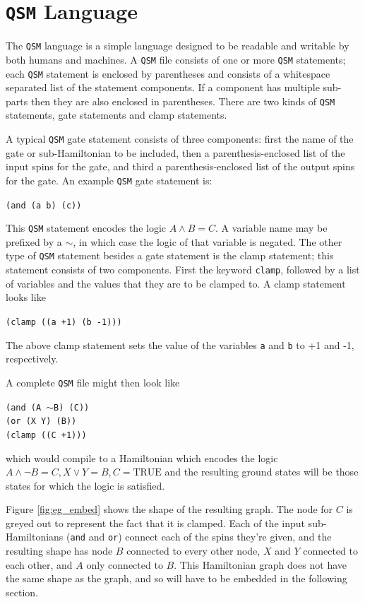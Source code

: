 \section{\texttt{QSM} Language}
The \texttt{QSM} language is a simple language designed to be readable and writable by both humans and machines.  A \texttt{QSM} file consists of one or more \texttt{QSM} statements; each \texttt{QSM} statement is enclosed by parentheses and consists of a whitespace separated list of the statement components.  If a component has multiple sub-parts then they are also enclosed in parentheses.  There are two kinds of \texttt{QSM} statements, gate statements and clamp statements.

A typical \texttt{QSM} gate statement consists of three components: first the name of the gate or sub-Hamiltonian to be included, then a parenthesis-enclosed list of the input spins for the gate, and third a parenthesis-enclosed list of the output spins for the gate.  An example \texttt{QSM} gate statement is: 
\begin{center}
	\texttt{(and (a b) (c))}
\end{center}
This \texttt{QSM} statement encodes the logic $A \wedge B = C$.  A variable name may be prefixed by a $\sim$, in which case the logic of that variable is negated.  The other type of \texttt{QSM} statement besides a gate statement is the clamp statement; this statement consists of two components.  First the keyword \texttt{clamp}, followed by a list of variables and the values that they are to be clamped to.  A clamp statement looks like
\begin{center}
	\texttt{(clamp ((a +1) (b -1)))}
\end{center}
The above clamp statement sets the value of the variables \texttt{a} and \texttt{b} to +1 and -1, respectively.

A complete \texttt{QSM} file might then look like

\begin{center}
	\texttt{(and (A $\sim$B) (C))}\\
	\texttt{(or (X Y) (B))}\\
	\texttt{(clamp ((C +1)))}
\end{center}
which would compile to a Hamiltonian which encodes the logic $A \wedge \neg B = C, X \vee Y = B, C = \text{TRUE}$ and the resulting ground states will be those states for which the logic is satisfied.

Figure \ref{fig:eg_embed} shows the shape of the resulting graph.  The node for $C$ is greyed out to represent the fact that it is clamped.  Each of the input sub-Hamiltonians (\texttt{and} and \texttt{or}) connect each of the spins they're given, and the resulting shape has node $B$ connected to every other node, $X$ and $Y$ connected to each other, and $A$ only connected to $B$.  This Hamiltonian graph does not have the same shape as the \machine graph, and so will have to be embedded in the following section.

